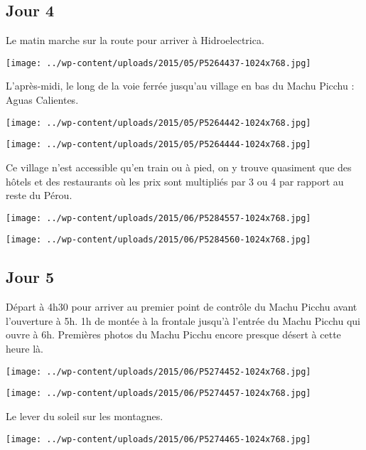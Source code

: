 \subsection*{Jour 4} 
Le matin marche sur la route pour arriver à Hidroelectrica. 
\begin{center} \texttt{[image: ../wp-content/uploads/2015/05/P5264437-1024x768.jpg]} \end{center}

L'après-midi, le long de la voie ferrée jusqu'au village en bas du Machu Picchu : Aguas Calientes. 
\begin{center} \texttt{[image: ../wp-content/uploads/2015/05/P5264442-1024x768.jpg]} \end{center}
\begin{center} \texttt{[image: ../wp-content/uploads/2015/05/P5264444-1024x768.jpg]} \end{center}

Ce village n'est accessible qu'en train ou à pied, on y trouve quasiment que des hôtels et des restaurants où les prix sont multipliés par 3 ou 4 par rapport au reste du Pérou. 
\begin{center} \texttt{[image: ../wp-content/uploads/2015/06/P5284557-1024x768.jpg]} \end{center}
\begin{center} \texttt{[image: ../wp-content/uploads/2015/06/P5284560-1024x768.jpg]} \end{center}

\subsection*{Jour 5} 
Départ à 4h30 pour arriver au premier point de contrôle du Machu Picchu avant l'ouverture à 5h.  1h de montée à la frontale jusqu'à l'entrée du Machu Picchu qui ouvre à 6h. 
Premières photos du Machu Picchu encore presque désert à cette heure là. 
\begin{center} \texttt{[image: ../wp-content/uploads/2015/06/P5274452-1024x768.jpg]} \end{center}
\begin{center} \texttt{[image: ../wp-content/uploads/2015/06/P5274457-1024x768.jpg]} \end{center}

Le lever du soleil sur les montagnes. 
\begin{center} \texttt{[image: ../wp-content/uploads/2015/06/P5274465-1024x768.jpg]} \end{center}
\vspace{-\topsep}
\pagebreak

